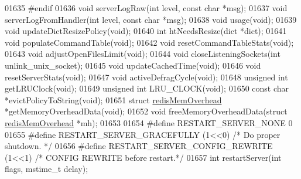 \begin{DoxyCode}
{{{{{{{01635 \textcolor{preprocessor}{#}\textcolor{preprocessor}{endif}
01636 \textcolor{keywordtype}{void} serverLogRaw(\textcolor{keywordtype}{int} level, \textcolor{keyword}{const} \textcolor{keywordtype}{char} *msg);
01637 \textcolor{keywordtype}{void} serverLogFromHandler(\textcolor{keywordtype}{int} level, \textcolor{keyword}{const} \textcolor{keywordtype}{char} *msg);
01638 \textcolor{keywordtype}{void} usage(\textcolor{keywordtype}{void});
01639 \textcolor{keywordtype}{void} updateDictResizePolicy(\textcolor{keywordtype}{void});
01640 \textcolor{keywordtype}{int} htNeedsResize(dict *dict);
01641 \textcolor{keywordtype}{void} populateCommandTable(\textcolor{keywordtype}{void});
01642 \textcolor{keywordtype}{void} resetCommandTableStats(\textcolor{keywordtype}{void});
01643 \textcolor{keywordtype}{void} adjustOpenFilesLimit(\textcolor{keywordtype}{void});
01644 \textcolor{keywordtype}{void} closeListeningSockets(\textcolor{keywordtype}{int} unlink\_unix\_socket);
01645 \textcolor{keywordtype}{void} updateCachedTime(\textcolor{keywordtype}{void});
01646 \textcolor{keywordtype}{void} resetServerStats(\textcolor{keywordtype}{void});
01647 \textcolor{keywordtype}{void} activeDefragCycle(\textcolor{keywordtype}{void});
01648 \textcolor{keywordtype}{unsigned} \textcolor{keywordtype}{int} getLRUClock(\textcolor{keywordtype}{void});
01649 \textcolor{keywordtype}{unsigned} \textcolor{keywordtype}{int} LRU\_CLOCK(\textcolor{keywordtype}{void});
01650 \textcolor{keyword}{const} \textcolor{keywordtype}{char} *evictPolicyToString(\textcolor{keywordtype}{void});
01651 \textcolor{keyword}{struct} \hyperlink{structredisMemOverhead}{redisMemOverhead} *getMemoryOverheadData(\textcolor{keywordtype}{void});
01652 \textcolor{keywordtype}{void} freeMemoryOverheadData(\textcolor{keyword}{struct} \hyperlink{structredisMemOverhead}{redisMemOverhead} *mh);
01653 
01654 \textcolor{preprocessor}{#}\textcolor{preprocessor}{define} \textcolor{preprocessor}{RESTART\_SERVER\_NONE} 0
01655 \textcolor{preprocessor}{#}\textcolor{preprocessor}{define} \textcolor{preprocessor}{RESTART\_SERVER\_GRACEFULLY} \textcolor{preprocessor}{(}1\textcolor{preprocessor}{<<}0\textcolor{preprocessor}{)}     \textcolor{comment}{/* Do proper shutdown. */}
01656 \textcolor{preprocessor}{#}\textcolor{preprocessor}{define} \textcolor{preprocessor}{RESTART\_SERVER\_CONFIG\_REWRITE} \textcolor{preprocessor}{(}1\textcolor{preprocessor}{<<}1\textcolor{preprocessor}{)} \textcolor{comment}{/* CONFIG REWRITE before restart.*/}
01657 \textcolor{keywordtype}{int} restartServer(\textcolor{keywordtype}{int} flags, mstime\_t delay);
}}}}}}}
\end{DoxyCode}
